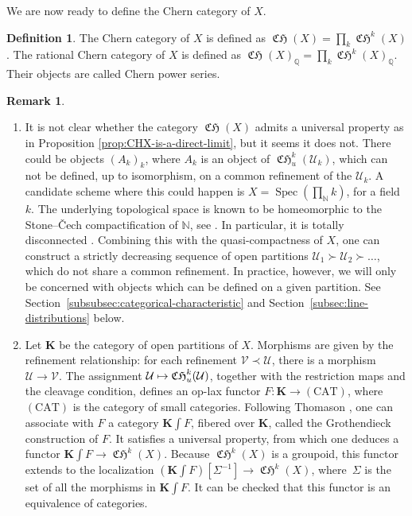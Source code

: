 \documentclass[JEP,XML,SOM,Unicode,published]{cedram}
\newcommand\mto{\mathchoice{\longmapsto}{\mapsto}{\mapsto}{\mapsto}}
\theoremstyle{plain}
\theoremstyle{definition}
\newtheorem{definition}[theorem]{Definition}
\newtheorem{remark}[theorem]{Remark}
\newcommand{\Kbold}{\mathbf{K}}
\newcommand{\NBbb}{\mathbb N}
\newcommand{\QBbb}{\mathbb Q}
\newcommand{\Ucal}{\mathcal U}
\newcommand{\Vcal}{\mathcal V}
\DeclareMathOperator{\CHfrak}{\mathfrak{CH}}
\DeclareMathOperator{\Spec}{Spec}
\begin{document}
We are now ready to define the Chern category of $X$.

\begin{definition}
The Chern category of $X$ is defined as $\CHfrak(X)=\prod_{k}\CHfrak^{k}(X)$. The rational Chern category of $X$ is defined as $\CHfrak(X)_{\QBbb}=\prod_{k}\CHfrak^{k}(X)_{\QBbb}$. Their objects are called Chern power series.
\end{definition}

\skpt
\begin{remark}\label{rmk:Grothendieck-construction}
\begin{enumerate}
\item\label{item:Grothendieck-construction-1} It is not clear whether the category $\CHfrak(X)$ admits a universal property as in Proposition \ref{prop:CHX-is-a-direct-limit}, but it seems it does not. There could be objects $(A_{k})_{k}$, where $A_{k}$ is an object of $\CHfrak^{k}_{u}(\Ucal_{k})$, which can not be defined, up to isomorphism, on a common refinement of the $\Ucal_{k}$. A candidate scheme where this could happen is $X=\Spec(\prod_{\NBbb}k)$, for a field $k$. The underlying topological space is known to be homeomorphic to the Stone--\v{C}ech compactification of $\NBbb$, see \cite[Ex.\,G, Chap.\,II]{Mumford-red}. In particular, it is totally disconnected \cite[\href{https://stacks.math.columbia.edu/tag/090C}{090C}]{stacks-project}. Combining this with the quasi-compactness of $X$, one can construct a strictly decreasing sequence of open partitions $\Ucal_{1}\succ\Ucal_{2}\succ\ldots$, which do not share a common refinement. In practice, however, we will only be concerned with objects which can be defined on a given partition. See Section~\ref{subsubsec:categorical-characteristic} and Section~\ref{subsec:line-distributions} below.
\item Let $\Kbold$ be the category of open partitions of $X$. Morphisms are given by the refinement relationship: for each refinement $\Vcal\prec\Ucal$, there is a morphism $\Ucal\to\Vcal$. The assignment $\Ucal\mto\CHfrak_{u}^{k}(\Ucal)$, together with the restriction maps and the cleavage condition, defines an op-lax functor $F\colon \Kbold\to\mathrm{(CAT)}$, where $\mathrm{(CAT)}$ is the category of small categories. Following Thomason \cite[\S 3]{ThomasonHomCol}, one can associate with $F$ a category $\Kbold\int F$, fibered over $\Kbold$, called the Grothendieck construction of $F$. It satisfies a universal property, from which one deduces a functor $\Kbold\int F\to\CHfrak^{k}(X)$. Because $\CHfrak^{k}(X)$ is a groupoid, this functor extends to the localization $(\Kbold\int F)[\Sigma^{-1}]\to\CHfrak^{k}(X)$, where~$\Sigma$ is the set of all the morphisms in $\Kbold\int F$. It can be checked that this functor is an equivalence of categories.
\end{enumerate}
\end{remark}
\end{document}
